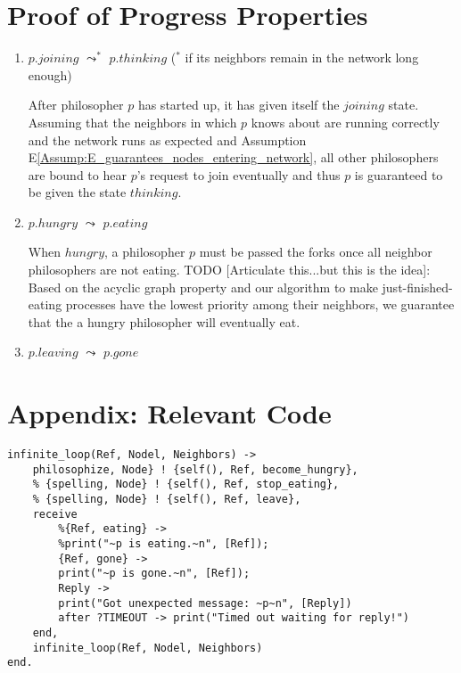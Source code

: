 \documentclass[11pt]{article}
\begin{document}
\section{Proof of Progress Properties}
\begin{enumerate}[PG1]
\item
$p.joining$ $\leadsto^*$ $p.thinking$ ($^*$ if its neighbors remain in the network long enough) 

\indent After philosopher $p$ has started up, it has given itself the $joining$ state. Assuming that the neighbors in which $p$ knows about are running correctly and the network runs as expected and Assumption E\ref{Assump:E_guarantees_nodes_entering_network}, all other philosophers are bound to hear $p$'s request to join eventually and thus $p$ is guaranteed to be given the state $thinking$.

\item  $p.hungry$ $\leadsto$ $p.eating$

\indent When $hungry$, a philosopher $p$ must be passed the forks once all neighbor philosophers are not eating. TODO [Articulate this...but this is the idea]: Based on the acyclic graph property and our algorithm to make just-finished-eating processes have the lowest priority among their neighbors, we guarantee that the a hungry philosopher will eventually eat.

\item 
$p.leaving$ $\leadsto$ $p.gone$
\end{enumerate}

\section{Appendix: Relevant Code}

\begin{lstlisting}
infinite_loop(Ref, Nodel, Neighbors) ->
    philosophize, Node} ! {self(), Ref, become_hungry},
    % {spelling, Node} ! {self(), Ref, stop_eating},
    % {spelling, Node} ! {self(), Ref, leave},
    receive
        %{Ref, eating} ->          
        %print("~p is eating.~n", [Ref]);
        {Ref, gone} ->
        print("~p is gone.~n", [Ref]);
        Reply ->
        print("Got unexpected message: ~p~n", [Reply])
        after ?TIMEOUT -> print("Timed out waiting for reply!")
    end,
    infinite_loop(Ref, Nodel, Neighbors)
end.
\end{lstlisting}
\end{document}
